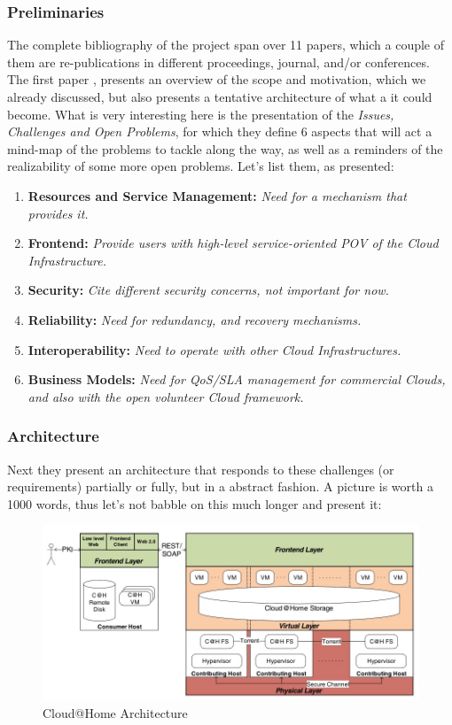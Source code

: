 \documentclass[11pt]{amsart}
\begin{document}
	\subsubsection{Preliminaries}
	The complete bibliography of the project span over 11 papers, which a couple of them are re-publications 
	in different proceedings, journal, and/or conferences. The first paper \citet{cathome}, presents 
	an overview of the scope and motivation, which we already discussed, but also presents a tentative 
	architecture of what a it could become. What is very interesting here is the presentation of the 
	\emph{Issues, Challenges and Open Problems}, for which they define 6 aspects that will act a 
	mind-map of the problems to tackle along the way, as well as a reminders of the realizability of 
	some more open problems. Let's list them, as presented: 
	\begin{enumerate}
		\item{\textbf{Resources and Service Management:}}\emph{ Need for a mechanism that provides it.}
		\item{\textbf{Frontend:}}\emph{ Provide users with high-level service-oriented POV of the Cloud 
		Infrastructure.}
		\item{\textbf{Security:}}\emph{ Cite different security concerns, not important for now.}
		\item{\textbf{Reliability:}}\emph{ Need for redundancy, and recovery mechanisms.}
		\item{\textbf{Interoperability:}}\emph{ Need to operate with other Cloud Infrastructures.}
		\item{\textbf{Business Models:}}\emph{ Need for QoS/SLA management for commercial Clouds, and 
		also with the open volunteer Cloud framework.}
	\end{enumerate}
	
	\subsubsection{Architecture}
	Next they present an architecture that responds to these challenges (or requirements) partially 
	or fully, but in a abstract fashion. A picture is worth a 1000 words, thus let's not babble on this 
	much longer and present it: 
	
	\begin{center}
		\begin{figure}[h]
			\includegraphics[width=125mm]{cathome_arch.jpg}
			\caption{Cloud@Home Architecture\label{cathome_arch}}
		\end{figure}
	\end{center}
	
\end{document}
